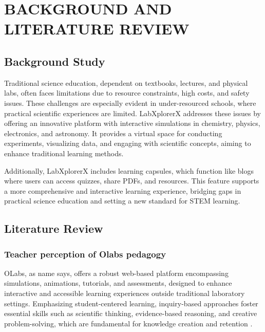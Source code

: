 \chapter{BACKGROUND AND LITERATURE REVIEW}





\section{Background Study}

Traditional science education, dependent on textbooks, lectures, and physical labs, often faces limitations due to resource constraints, high costs, and safety issues. These challenges are especially evident in under-resourced schools, where practical scientific experiences are limited.
LabXplorerX addresses these issues by offering an innovative platform with interactive simulations in chemistry, physics, electronics, and astronomy. It provides a virtual space for conducting experiments, visualizing data, and engaging with scientific concepts, aiming to enhance traditional learning methods.

Additionally, LabXplorerX includes learning capsules, which function like blogs where users can access quizzes, share PDFs, and resources. This feature supports a more comprehensive and interactive learning experience, bridging gaps in practical science education and setting a new standard for STEM learning.
\section{Literature Review}
\subsection*{Teacher perception of Olabs pedagogy}
OLabs, as name says, offers a robust web-based platform encompassing simulations, animations, tutorials, and assessments, designed to enhance interactive and accessible learning experiences outside traditional laboratory settings. Emphasizing student-centered learning, inquiry-based approaches foster essential skills such as scientific thinking, evidence-based reasoning, and creative problem-solving, which are fundamental for knowledge creation and retention \cite{chandrashekhar2020teacher}.
